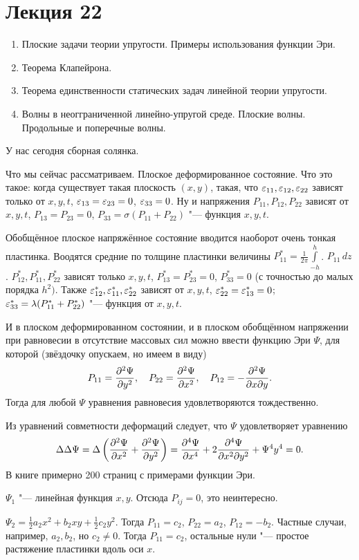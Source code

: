 \section{Лекция 22}
\begin{enumerate}
\item Плоские задачи теории упругости. Примеры использования функции Эри.
\item Теорема Клапейрона.
\item Теорема единственности статических задач линейной теории упругости.
\item Волны в неогграниченной линейно-упругой среде. Плоские волны. Продольные и поперечные волны.
\end{enumerate}
У нас сегодня сборная солянка.

Что мы сейчас рассматриваем. Плоское деформированное состояние. Что это такое: когда существует такая плоскость $(x,y)$, такая, что $\varepsilon_{11},\varepsilon_{12},\varepsilon_{22}$ зависят только от $x,y,t$, $\varepsilon_{13} =\varepsilon_{23}=0$, $\varepsilon_{33}=0$. Ну и напряжения $P_{11},P_{12},P_{22}$ зависят от $x,y,t$, $P_{13} = P_{23}=0$, $P_{33} = \sigma (P_{11} + P_{22})$ "--- функция $x,y,t$.

Обобщённое плоское напряжённое состояние вводится наоборот очень тонкая пластинка.
Воодятся средние по толщине пластинки величины $P^*_{11} = \frac1{2\pi}\int\limits_{-h}^h$. $ P_{11}\,dz$. $P_{12}^*,P_{11}^*,P_{22}^*$ зависят только $x,y,t$, $P_{13}^* = P_{23}^*=0$, $P_{33}^* = 0$ (с точностью до малых порядка $h^2)$. Также $\varepsilon^*_{12},\varepsilon_{11}^*,\varepsilon_{22}^*$ зависят от $x,y,t$, $\varepsilon_{22}^* = \varepsilon_{13}^*=0$; $\varepsilon_{33}^* = \lambda(P_{11}^* + P_{22}^*)$ "--- функция от $x,y,t$.

И в плоском деформированном состоянии, и в плоском обобщённом напряжении при равновесии в отсутствие массовых сил можно ввести функцию Эри $\Psi$, для которой (звёздочку опускаем, но имеем в виду)
\[
  P_{11} = \frac{\partial ^2\Psi}{\partial y^2},\quad
  P_{22} = \frac{\partial ^2\Psi}{\partial x^2},\quad
  P_{12} = -\frac{\partial ^2\Psi}{\partial x\partial y}.
\]
Тогда для любой $\Psi$ уравнения равновесия удовлетворяются тождественно.

Из уравнений совметности деформаций следует, что $\Psi$ удовлетворяет уравнению
\[
  \Delta\Delta\Psi = \Delta\left( \frac{\partial ^2\Psi}{\partial x^2} + \frac{\partial ^2\Psi}{\partial y^2} \right)=
  \frac{\partial ^4\Psi}{\partial x^4} + 2\frac{\partial ^4\Psi}{\partial x^2\partial y^2} + \Psi{^4}{y^4} = 0.
\]
В книге \cite{timo} примерно 200 страниц с примерами функции Эри.

\begin{Exa}
  $\Psi_1$ "--- линейная функция $x,y$. Отсюда $P_{ij} = 0$, это неинтересно.
\end{Exa}
\begin{Exa}
  $\Psi_2 = \frac12 a_2 x^2 + b_2 xy + \frac12 c_2 y^2$. Тогда $P_{11} = c_2$, $P_{22} =a_2$, $P_{12}= - b_2$. Частные случаи, например, $a_2,b_2$, но $c_2\ne 0$. Тогда $P_{11} = c_2$, остальные нули "--- простое растяжение пластинки вдоль оси $x$.
\end{Exa}

